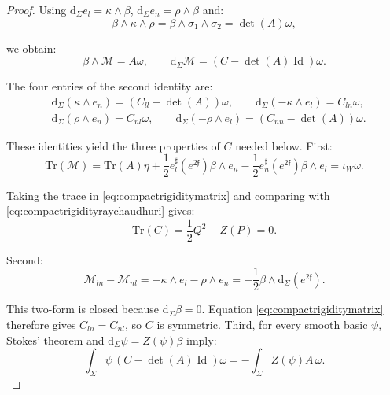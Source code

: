 \documentclass[10pt,reqno,a4paper]{amsart}
\theoremstyle{plain}
\theoremstyle{definition}
\theoremstyle{remark}
\theoremstyle{remark}
\def\dd{\mathrm{d}}
\newcommand{\Tr}{\mathrm{Tr}}
\renewcommand{\(}{ (}
\renewcommand{\)}{ )}
\newcommand{\frf}{\mathfrak{f}}
\begin{document}
\begin{proof}
\noindent
Using $\dd_{\Sigma}e_l=\kappa\wedge\beta$, $\dd_{\Sigma}e_n=\rho\wedge\beta$ and:
\begin{equation*}
\beta\wedge\kappa\wedge\rho = \beta\wedge\sigma_1\wedge\sigma_2 =
\det(A)\omega,
\end{equation*}
	
\noindent
we obtain:
\begin{equation}
\label{eq:compactrigiditymatrix}
\beta\wedge\mathcal{M}=A\omega, \qquad \dd_{\Sigma}\mathcal{M} =
(C-\det(A)\operatorname{Id} )\omega.
\end{equation}
	
\noindent
The four entries of the second identity are:
\begin{eqnarray*}
& \dd_{\Sigma} (\kappa\wedge e_n) = (C_{ll}-\det(A))\omega, \qquad \dd_{\Sigma}(-\kappa\wedge e_l)=C_{ln}\omega, \\
& \dd_{\Sigma}(\rho\wedge e_n)=C_{nl}\omega, \qquad \dd_{\Sigma}(-\rho\wedge e_l) = (C_{nn}-\det(A))\omega.
\end{eqnarray*}
	
\noindent
These identities yield the three properties of $C$ needed below. First:
\begin{equation*}
\Tr(\mathcal{M}) = \Tr(A)\eta + \frac{1}{2}e_l^{\sharp}(e^{2\frf})\beta\wedge e_n -\frac{1}{2}e_n^{\sharp}(e^{2\frf})\beta\wedge e_l =  \iota_W\omega.
\end{equation*}
	
\noindent
Taking the trace in \eqref{eq:compactrigiditymatrix} and comparing with \eqref{eq:compactrigidityraychaudhuri} gives:
\begin{equation*}
\Tr(C)=\frac{1}{2}Q^2-Z(P)=0.
\end{equation*}
	
\noindent
Second:
\begin{equation*}
\mathcal{M}_{ln}-\mathcal{M}_{nl} = -\kappa\wedge e_l-\rho\wedge e_n =
-\frac{1}{2}\beta\wedge\dd_{\Sigma}(e^{2\frf}).
\end{equation*}
	
\noindent
This two-form is closed because $\dd_{\Sigma}\beta=0$. Equation \eqref{eq:compactrigiditymatrix} therefore gives $C_{ln}=C_{nl}$, so $C$ is symmetric. Third, for every smooth basic $\psi$, Stokes' theorem and $\dd_{\Sigma}\psi=Z(\psi)\beta$ imply:
\begin{equation*}
\int_{\Sigma}\psi\, (C-\det(A)\operatorname{Id} )\omega = -\int_{\Sigma}Z(\psi)A\,\omega.
\end{equation*}
	

\end{proof}
\end{document}
